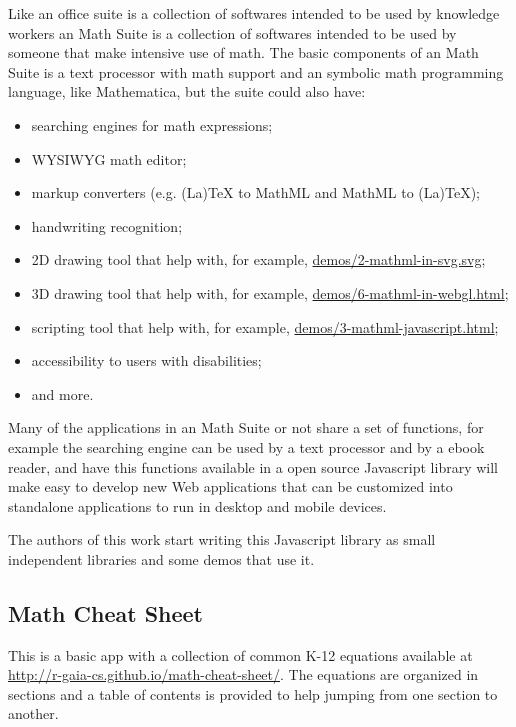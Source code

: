 Like an office suite is a collection of softwares intended to be used by
knowledge workers an Math Suite is a collection of softwares intended to be used
by someone that make intensive use of math. The basic components of an Math
Suite is a text processor with math support and an symbolic math programming
language, like Mathematica, but the suite could also have:
\begin{itemize}
  \item searching engines for math expressions;
  \item WYSIWYG math editor;
  \item markup converters (e.g. (La)TeX to MathML and MathML to (La)TeX);
  \item handwriting recognition;
  \item 2D drawing tool that help with, for example,
    \href{http://fred-wang.github.io/MathUI2014/demos/2-mathml-in-svg.svg}{demos/2-mathml-in-svg.svg};
  \item 3D drawing tool that help with, for example,
    \href{http://fred-wang.github.io/MathUI2014/demos/6-mathml-in-webgl.html}{demos/6-mathml-in-webgl.html};
  \item scripting tool that help with, for example,
    \href{http://fred-wang.github.io/MathUI2014/demos/3-mathml-javascript.html}{demos/3-mathml-javascript.html};
  \item accessibility to users with disabilities;
  \item and more.
\end{itemize}

Many of the applications in an Math Suite or not share a set of functions, for
example the searching engine can be used by a text processor and by a ebook
reader, and have
this functions available in a open source Javascript library will make easy to
develop new Web applications that can be customized into standalone applications
to run in desktop and mobile devices.

The authors of this work start writing this Javascript library as small
independent libraries and some demos that use it.

\subsection{Math Cheat Sheet}

This is a basic app with a collection of common K-12 equations available at
\href{http://r-gaia-cs.github.io/math-cheat-sheet/}{http://r-gaia-cs.github.io/math-cheat-sheet/}.
The equations are organized in sections and a table of contents is provided to
help jumping from one section to another.

